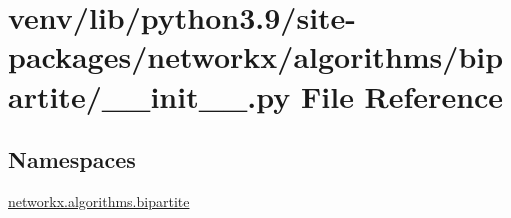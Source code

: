 \hypertarget{venv_2lib_2python3_89_2site-packages_2networkx_2algorithms_2bipartite_2____init_____8py}{}\section{venv/lib/python3.9/site-\/packages/networkx/algorithms/bipartite/\+\_\+\+\_\+init\+\_\+\+\_\+.py File Reference}
\label{venv_2lib_2python3_89_2site-packages_2networkx_2algorithms_2bipartite_2____init_____8py}
\subsection*{Namespaces}
\begin{DoxyCompactItemize}
\item 
 \hyperlink{namespacenetworkx_1_1algorithms_1_1bipartite}{networkx.\+algorithms.\+bipartite}
\end{DoxyCompactItemize}
